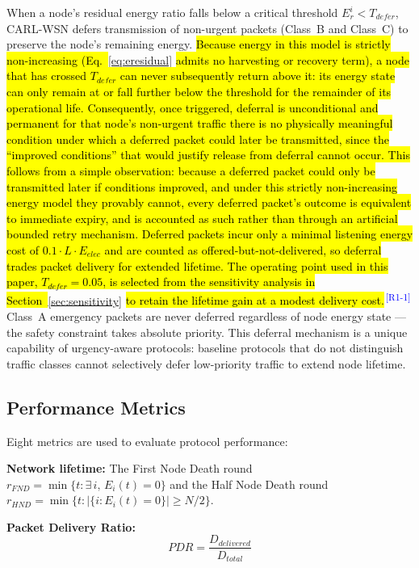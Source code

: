 \documentclass[12pt]{article}
\newcommand{\rtag}[1]{\textsuperscript{\textcolor{blue}{\scriptsize\,[#1]}}}
\newcommand{\hlx}[1]{{\exhyphenpenalty=10000\hyphenpenalty=10000\let\ \nobreakspace\hl{#1}}}
\begin{document}
When a node's residual energy ratio falls below a critical threshold
$E_r^i < T_{defer}$, CARL-WSN defers transmission of non-urgent
packets (Class~B and Class~C) to preserve the node's remaining
energy. \hlx{Because energy in this model is strictly non-increasing
(Eq.~}\ref{eq:eresidual}\hlx{ admits no harvesting or recovery term), a
node that has crossed $T_{defer}$ can never subsequently return above
it: its energy state can only remain at or fall further below the
threshold for the remainder of its operational life. Consequently,
once triggered, deferral is unconditional and permanent for that
node's non-urgent traffic \textemdash{} there is no physically meaningful
condition under which a deferred packet could later be transmitted,
since the ``improved conditions'' that would justify release from
deferral cannot occur. This follows from a simple observation:
because a deferred packet could only be transmitted later if
conditions improved, and under this strictly non-increasing energy
model they provably cannot, every deferred packet's outcome is
equivalent to immediate expiry, and is accounted as such rather than
through an artificial bounded retry mechanism. Deferred packets
incur only a minimal listening energy cost of $0.1 \cdot L \cdot E_{elec}$ and are counted as
offered-but-not-delivered, so deferral trades packet delivery for
extended lifetime. The operating point used in this paper,
$T_{defer} = 0.05$, is selected from the sensitivity analysis in
Section~}\ref{sec:sensitivity}\hlx{ to retain the lifetime gain at a
modest delivery cost.}\rtag{R1-1} Class~A emergency packets are never deferred
regardless of node energy state --- the safety constraint takes
absolute priority. This deferral mechanism is a unique capability of
urgency-aware protocols: baseline protocols that do not distinguish
traffic classes cannot selectively defer low-priority traffic to
extend node lifetime.

\subsection{Performance Metrics}

Eight metrics are used to evaluate protocol performance:

\textbf{Network lifetime:} The First Node Death round
$r_{FND} = \min\{t : \exists\, i,\, E_i(t) = 0\}$ and the Half
Node Death round $r_{HND} = \min\{t : |\{i : E_i(t) = 0\}|
\geq N/2\}$.

\textbf{Packet Delivery Ratio:}
\begin{equation}
PDR = \frac{D_{delivered}}{D_{total}}
\label{eq:pdr}
\end{equation}
\end{document}
